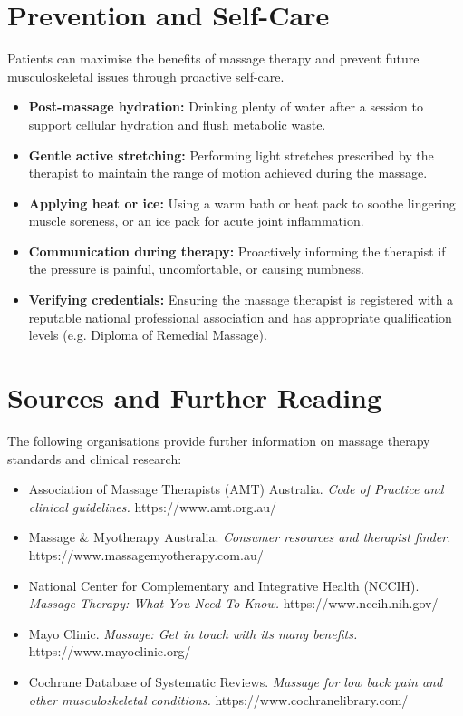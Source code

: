 \section*{Prevention and Self-Care}
Patients can maximise the benefits of massage therapy and prevent future musculoskeletal issues through proactive self-care.
\begin{itemize}
    \item \textbf{Post-massage hydration:} Drinking plenty of water after a session to support cellular hydration and flush metabolic waste.
    \item \textbf{Gentle active stretching:} Performing light stretches prescribed by the therapist to maintain the range of motion achieved during the massage.
    \item \textbf{Applying heat or ice:} Using a warm bath or heat pack to soothe lingering muscle soreness, or an ice pack for acute joint inflammation.
    \item \textbf{Communication during therapy:} Proactively informing the therapist if the pressure is painful, uncomfortable, or causing numbness.
    \item \textbf{Verifying credentials:} Ensuring the massage therapist is registered with a reputable national professional association and has appropriate qualification levels (e.g. Diploma of Remedial Massage).
\end{itemize}

\section*{Sources and Further Reading}
The following organisations provide further information on massage therapy standards and clinical research:
\begin{itemize}
    \item Association of Massage Therapists (AMT) Australia. \textit{Code of Practice and clinical guidelines.} https://www.amt.org.au/
    \item Massage \& Myotherapy Australia. \textit{Consumer resources and therapist finder.} https://www.massagemyotherapy.com.au/
    \item National Center for Complementary and Integrative Health (NCCIH). \textit{Massage Therapy: What You Need To Know.} https://www.nccih.nih.gov/
    \item Mayo Clinic. \textit{Massage: Get in touch with its many benefits.} https://www.mayoclinic.org/
    \item Cochrane Database of Systematic Reviews. \textit{Massage for low back pain and other musculoskeletal conditions.} https://www.cochranelibrary.com/
\end{itemize}
